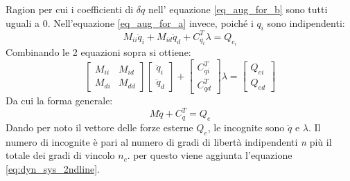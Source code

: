 Ragion per cui i coefficienti di $\delta q$ nell' equazione \ref{eq_aug_for_b} sono tutti uguali a 0. Nell'equazione \ref{eq_aug_for_a} invece, poiché i $q_i$ sono indipendenti: \begin{equation}
M_{ii} \ddot{q}_i + M_{id}\ddot{q}_d +C^T_{q_i} \lambda = Q_{e_i}
\end{equation}
Combinando le 2 equazioni sopra si ottiene:
\[ \begin{bmatrix}  M_{ii} & M_{id} \\ M_{di} & M_{dd} \end{bmatrix}
\begin{bmatrix}\ddot{q}_i \\ \ddot{q}_d \end{bmatrix} +
\begin{bmatrix} C_{qi}^T \\ C_{qd}^T\end{bmatrix} \lambda = 
\begin{bmatrix} Q_{ei} \\ Q_{ed} \end{bmatrix}
\]
Da cui la forma generale: \begin{equation}
M\ddot{q} + C^T_q = Q_e	\end{equation}
Dando per noto il vettore delle forze esterne $Q_e$, le incognite sono $\ddot{q}$ e $\lambda$. Il numero di incognite è pari al numero di gradi di libertà indipendenti \emph{n} più il totale dei gradi di vincolo $n_c$. per questo viene aggiunta l'equazione \ref{eq:dyn_sys_2ndline}.